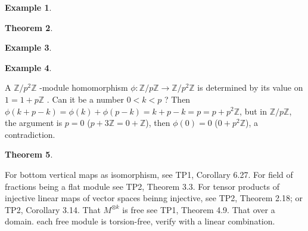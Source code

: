 \documentclass{article}
\newtheorem{theorem}{Theorem}[section]
\newtheorem{example}[theorem]{Example}
\begin{document}
\begin{example}
\end{example}

\begin{theorem}
\end{theorem}

\begin{example}
\end{example}

\begin{example}
\end{example}
A $ \mathbb{Z} / p^2 \mathbb{Z} $ -module homomorphism $ \phi: \mathbb{Z} / p\mathbb{Z} \rightarrow \mathbb{Z} / p^2 \mathbb{Z}$ is determined by its value on $1 = 1 + p \mathbb{Z}$ . Can it be a number $ 0 < k < p $ ? Then $ \phi(k + p - k) = \phi(k) + \phi(p - k) = k + p - k = p = p + p^2 \mathbb{Z} $, but in $\mathbb{Z}/p\mathbb{Z}$, the argument is $p = 0$ ($p + 3\mathbb{Z} = 0 + \mathbb{Z}$), then $\phi(0) = 0$ ($0 + p^2\mathbb{Z}$), a contradiction.

\begin{theorem}
\end{theorem}
For bottom vertical maps as isomorphism, see TP1, Corollary 6.27.
For field of fractions being a flat module see TP2, Theorem 3.3.
For tensor products of injective linear maps of vector spaces beinng injective, see TP2, Theorem 2.18; or TP2, Corollary 3.14. That $ M^{\otimes k} $ is free see TP1, Theorem 4.9. That over a domain. each free module is torsion-free, verify with a linear combination.
\end{document}
